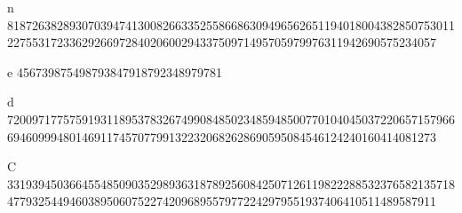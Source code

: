 n
818726382893070394741300826633525586686309496562651194018004382850753011227553172336292669728402060029433750971495705979976311942690575234057

e
456739875498793847918792348979781

d
720097177575919311895378326749908485023485948500770104045037220657157966694609994801469117457077991322320682628690595084546124240160414081273

C
331939450366455485090352989363187892560842507126119822288532376582135718477932544946038950607522742096895579772242979551937406410511489587911